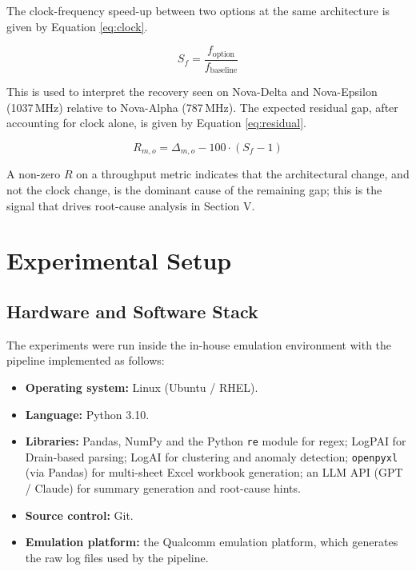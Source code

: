 \documentclass[conference]{IEEEtran}
\begin{document}
The clock-frequency speed-up between two options at the same architecture is given by Equation \ref{eq:clock}.

\begin{equation}
S_{f} = \frac{f_{\text{option}}}{f_{\text{baseline}}}
\label{eq:clock}
\end{equation}

This is used to interpret the recovery seen on Nova-Delta and Nova-Epsilon (1037\,MHz) relative to Nova-Alpha (787\,MHz). The expected residual gap, after accounting for clock alone, is given by Equation \ref{eq:residual}.

\begin{equation}
R_{m,o} = \Delta_{m,o} - 100 \cdot \left( S_f - 1 \right)
\label{eq:residual}
\end{equation}

A non-zero $R$ on a throughput metric indicates that the architectural change, and not the clock change, is the dominant cause of the remaining gap; this is the signal that drives root-cause analysis in Section V.

\section{Experimental Setup}

\subsection{Hardware and Software Stack}
The experiments were run inside the in-house emulation environment with the pipeline implemented as follows:
\begin{itemize}
\item \textbf{Operating system:} Linux (Ubuntu / RHEL).
\item \textbf{Language:} Python 3.10.
\item \textbf{Libraries:} Pandas, NumPy and the Python \texttt{re} module for regex; LogPAI for Drain-based parsing; LogAI for clustering and anomaly detection; \texttt{openpyxl} (via Pandas) for multi-sheet Excel workbook generation; an LLM API (GPT / Claude) for summary generation and root-cause hints.
\item \textbf{Source control:} Git.
\item \textbf{Emulation platform:} the Qualcomm emulation platform, which generates the raw log files used by the pipeline.
\end{itemize}
\end{document}

